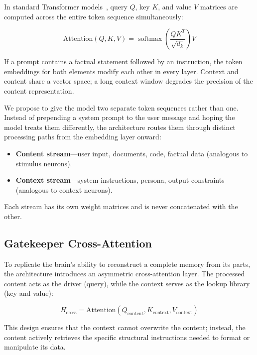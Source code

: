 \documentclass[11pt,a4paper]{article}
\theoremstyle{definition}
\DeclareMathOperator{\Softmax}{softmax}
\begin{document}
In standard Transformer models~\cite{Vaswani2017AttentionIA}, query $Q$, key $K$, and value $V$ matrices are computed across the entire token sequence simultaneously:

\begin{equation}\label{eq:standard_attn}
  \text{Attention}(Q, K, V) = \Softmax\left(\frac{QK^T}{\sqrt{d_k}}\right)V
\end{equation}

If a prompt contains a factual statement followed by an instruction, the token embeddings for both elements modify each other in every layer. Context and content share a vector space; a long context window degrades the precision of the content representation.

We propose to give the model two separate token sequences rather than one. Instead of prepending a system prompt to the user message and hoping the model treats them differently, the architecture routes them through distinct processing paths from the embedding layer onward:

\begin{itemize}
  \item \textbf{Content stream}---user input, documents, code, factual data (analogous to stimulus neurons).
  \item \textbf{Context stream}---system instructions, persona, output constraints (analogous to context neurons).
\end{itemize}

Each stream has its own weight matrices and is never concatenated with the other.

\subsection{Gatekeeper Cross-Attention}\label{sec:gatekeeper}

To replicate the brain's ability to reconstruct a complete memory from its parts, the architecture introduces an asymmetric cross-attention layer. The processed content acts as the driver (query), while the context serves as the lookup library (key and value):

\begin{equation}\label{eq:cross_attn}
  H_{\text{cross}} = \text{Attention}(Q_{\text{content}}, K_{\text{context}}, V_{\text{context}})
\end{equation}

This design ensures that the context cannot overwrite the content; instead, the content actively retrieves the specific structural instructions needed to format or manipulate its data.
\end{document}
